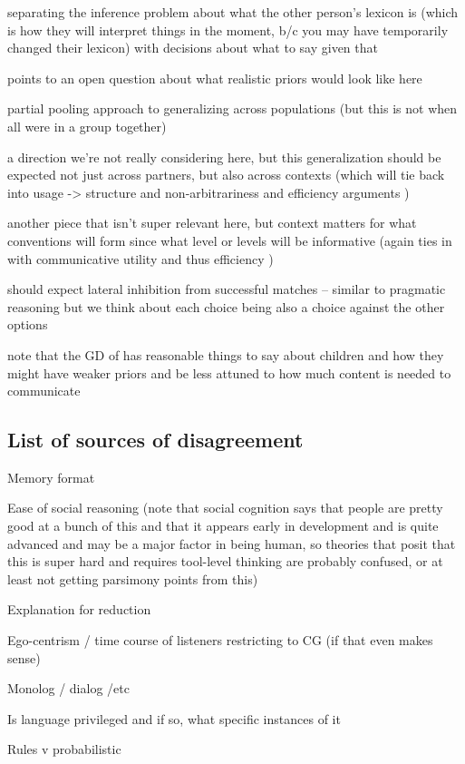 \documentclass[]{article}
\begin{document}
\cite{hawkins2021} separating the inference problem about what the other person's lexicon is (which is how they will interpret things in the moment, b/c you may have temporarily changed their lexicon) with decisions about what to say given that 

points to an open question about what realistic priors would look like here

partial pooling approach to generalizing across populations (but this is not when all were in a group together) 

a direction we're not really considering here, but this generalization should be expected not just across partners, but also across contexts (which will tie back into usage -> structure and non-arbitrariness and efficiency arguments )

another piece that isn't super relevant here, but context matters for what conventions will form since what level or levels will be informative (again ties in with communicative utility and thus efficiency )

should expect lateral inhibition from successful matches -- similar to pragmatic reasoning but we think about each choice being also a choice against the other options 

note that the GD of \cite{hawkins2021} has reasonable things to say about children and how they might have weaker priors and be less attuned to how much content is needed to communicate 

\subsection{List of sources of disagreement}

Memory format 

Ease of social reasoning (note that social cognition says that people are pretty good at a bunch of this and that it appears early in development and is quite advanced and may be a major factor in being human, so theories that posit that this is super hard and requires tool-level thinking are probably confused, or at least not getting parsimony points from this)

Explanation for reduction

Ego-centrism / time course of listeners restricting to CG (if that even makes sense)

Monolog / dialog /etc 

Is language privileged and if so, what specific instances of it

Rules v probabilistic
\end{document}
